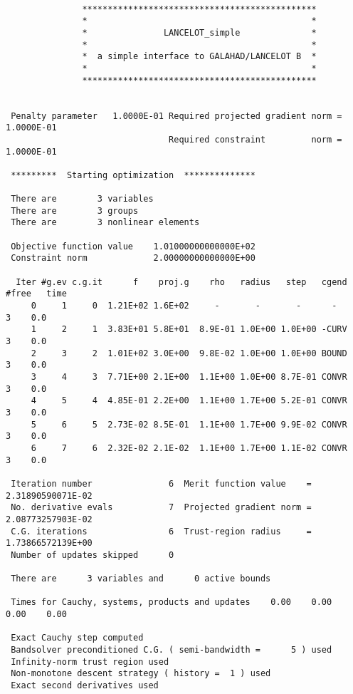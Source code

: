 \documentclass{article}
\begin{document}
\newpage
{\small
\def\baselinestretch{0.8}{\tt \begin{verbatim}

               **********************************************
               *                                            *
               *               LANCELOT_simple              *
               *                                            *
               *  a simple interface to GALAHAD/LANCELOT B  *
               *                                            *
               **********************************************


 Penalty parameter   1.0000E-01 Required projected gradient norm =   1.0000E-01
                                Required constraint         norm =   1.0000E-01

 *********  Starting optimization  **************

 There are        3 variables
 There are        3 groups
 There are        3 nonlinear elements

 Objective function value    1.01000000000000E+02
 Constraint norm             2.00000000000000E+00

  Iter #g.ev c.g.it      f    proj.g    rho   radius   step   cgend #free   time
     0     1     0  1.21E+02 1.6E+02     -       -       -      -       3    0.0
     1     2     1  3.83E+01 5.8E+01  8.9E-01 1.0E+00 1.0E+00 -CURV     3    0.0
     2     3     2  1.01E+02 3.0E+00  9.8E-02 1.0E+00 1.0E+00 BOUND     3    0.0
     3     4     3  7.71E+00 2.1E+00  1.1E+00 1.0E+00 8.7E-01 CONVR     3    0.0
     4     5     4  4.85E-01 2.2E+00  1.1E+00 1.7E+00 5.2E-01 CONVR     3    0.0
     5     6     5  2.73E-02 8.5E-01  1.1E+00 1.7E+00 9.9E-02 CONVR     3    0.0
     6     7     6  2.32E-02 2.1E-02  1.1E+00 1.7E+00 1.1E-02 CONVR     3    0.0

 Iteration number               6  Merit function value    =   2.31890590071E-02
 No. derivative evals           7  Projected gradient norm =   2.08773257903E-02
 C.G. iterations                6  Trust-region radius     =   1.73866572139E+00
 Number of updates skipped      0

 There are      3 variables and      0 active bounds

 Times for Cauchy, systems, products and updates    0.00    0.00    0.00    0.00

 Exact Cauchy step computed
 Bandsolver preconditioned C.G. ( semi-bandwidth =      5 ) used
 Infinity-norm trust region used
 Non-monotone descent strategy ( history =  1 ) used
 Exact second derivatives used


\end{verbatim}}}
\end{document}
